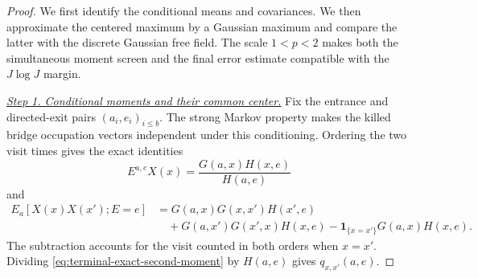 \begin{proof}
We first identify the conditional means and covariances.  We then
approximate the centered maximum by a Gaussian maximum and compare
the latter with the discrete Gaussian free field.  The scale
$1<p<2$ makes both the simultaneous moment screen and the final
error estimate compatible with the $J\log J$ margin.

\smallskip\noindent
\underline{\textit{Step 1. Conditional moments and their common center.}}
Fix the entrance and directed-exit pairs $(a_i,e_i)_{i\le b}$.
The strong Markov property makes the killed bridge occupation vectors
independent under this conditioning.  Ordering the two visit times
gives the exact identities
\begin{equation}
 E^{a,e}X(x)=\frac{G(a,x)H(x,e)}{H(a,e)}
 \tag{65}\label{eq:terminal-exact-mean}
\end{equation}
and
\begin{equation}
 \begin{split}
 E_a[X(x)X(x');E=e]
 &=G(a,x)G(x,x')H(x',e)\\
 &\quad+G(a,x')G(x',x)H(x,e)
 -\mathbf1_{\{x=x'\}}G(a,x)H(x,e).
 \end{split}
 \tag{66}\label{eq:terminal-exact-second-moment}
\end{equation}
The subtraction accounts for the visit counted in both orders when
$x=x'$.  Dividing \eqref{eq:terminal-exact-second-moment} by $H(a,e)$
gives $q_{x,x'}(a,e)$.


\end{proof}
